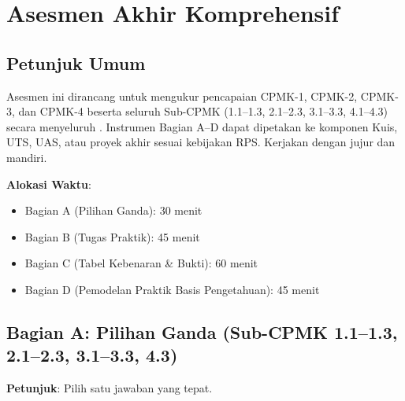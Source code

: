 \section{Asesmen Akhir Komprehensif}

\subsection{Petunjuk Umum}

Asesmen ini dirancang untuk mengukur pencapaian CPMK-1, CPMK-2, CPMK-3, dan CPMK-4 beserta seluruh Sub-CPMK (1.1--1.3, 2.1--2.3, 3.1--3.3, 4.1--4.3) secara menyeluruh \cite{rosen2019}. Instrumen Bagian A--D dapat dipetakan ke komponen Kuis, UTS, UAS, atau proyek akhir sesuai kebijakan RPS. Kerjakan dengan jujur dan mandiri.

\textbf{Alokasi Waktu}:
\begin{itemize}
  \item Bagian A (Pilihan Ganda): 30 menit
  \item Bagian B (Tugas Praktik): 45 menit
  \item Bagian C (Tabel Kebenaran \& Bukti): 60 menit
  \item Bagian D (Pemodelan Praktik Basis Pengetahuan): 45 menit
\end{itemize}

\subsection{Bagian A: Pilihan Ganda (Sub-CPMK 1.1--1.3, 2.1--2.3, 3.1--3.3, 4.3)}

\textbf{Petunjuk}: Pilih satu jawaban yang tepat.


